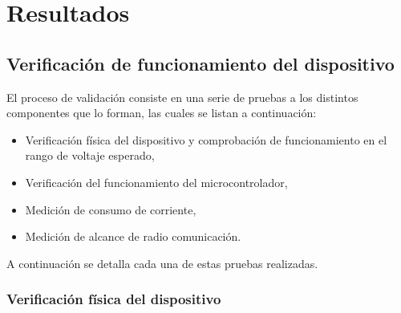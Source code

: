 \chapter{Resultados}



\section{Verificaci\'on de funcionamiento del dispositivo}

El proceso de validaci\'on consiste en una serie de pruebas a los distintos componentes que lo forman, las cuales se listan a continuaci\'on:

\begin{itemize}
\item Verificaci\'on f\'isica del dispositivo y comprobaci\'on de funcionamiento en el rango de voltaje esperado, 
\item Verificaci\'on del funcionamiento del microcontrolador, 
\item Medici\'on de consumo de corriente, 
\item Medici\'on de alcance de radio comunicaci\'on.
\end{itemize}

A continuaci\'on se detalla cada una de estas pruebas realizadas. 

\subsection{Verificaci\'on f\'isica del dispositivo}

